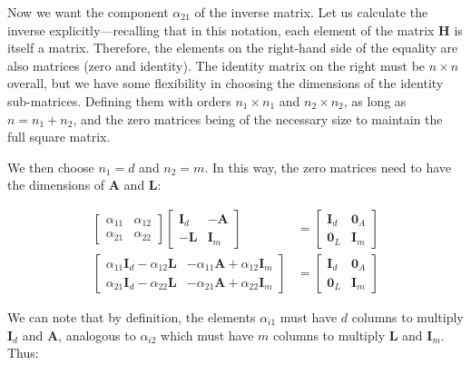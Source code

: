 Now we want the component $\alpha_{21}$ of the inverse matrix. Let us calculate the inverse explicitly—recalling that in this notation, each element of the matrix $\boldsymbol{H}$ is itself a matrix. Therefore, the elements on the right-hand side of the equality are also matrices (zero and identity). The identity matrix on the right must be $n\times n$ overall, but we have some flexibility in choosing the dimensions of the identity sub-matrices. Defining them with orders $n_{1}\times n_{1}$ and $n_{2}\times n_{2}$, as long as $n=n_{1}+n_{2}$, and the zero matrices being of the necessary size to maintain the full square matrix.

We then choose $n_{1}=d$ and $n_{2}=m$. In this way, the zero matrices need to have the dimensions of $\boldsymbol{A}$ and $\boldsymbol{L}$:



\begin{align}
\left[\begin{array}{cc}
\alpha_{11} & \alpha_{12}\\
\alpha_{21} & \alpha_{22}
\end{array}\right]\left[\begin{array}{cc}
\boldsymbol{I}_{d} & -\boldsymbol{A}\\
-\boldsymbol{L} & \boldsymbol{I}_{m}
\end{array}\right] & =\left[\begin{array}{cc}
\boldsymbol{I}_{d} & \boldsymbol{0}_{A}\\
\boldsymbol{0}_{L} & \boldsymbol{I}_{m}
\end{array}\right]\\
\left[\begin{array}{cc}
\alpha_{11}\boldsymbol{I}_{d}-\alpha_{12}\boldsymbol{L} & -\alpha_{11}\boldsymbol{A}+\alpha_{12}\boldsymbol{I}_{m}\\
\alpha_{21}\boldsymbol{I}_{d}-\alpha_{22}\boldsymbol{L} & -\alpha_{21}\boldsymbol{A}+\alpha_{22}\boldsymbol{I}_{m}
\end{array}\right] & =\left[\begin{array}{cc}
\boldsymbol{I}_{d} & \boldsymbol{0}_{A}\\
\boldsymbol{0}_{L} & \boldsymbol{I}_{m}
\end{array}\right]
\end{align}


We can note that by definition, the elements $\alpha_{i1}$ must have $d$ columns to multiply $\boldsymbol{I}_{d}$ and $\boldsymbol{A}$, analogous to $\alpha_{i2}$ which must have $m$ columns to multiply $\boldsymbol{L}$ and $\boldsymbol{I}_{m}$. Thus:

